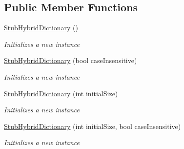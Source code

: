 \subsection*{Public Member Functions}
\begin{DoxyCompactItemize}
\item 
\hyperlink{class_system_1_1_collections_1_1_specialized_1_1_fakes_1_1_stub_hybrid_dictionary_a4633ca581483dcaaad14d17e2996f35e}{Stub\-Hybrid\-Dictionary} ()
\begin{DoxyCompactList}\small\item\em Initializes a new instance\end{DoxyCompactList}\item 
\hyperlink{class_system_1_1_collections_1_1_specialized_1_1_fakes_1_1_stub_hybrid_dictionary_a8f0cd601375b612a98ac9fbd739b54be}{Stub\-Hybrid\-Dictionary} (bool case\-Insensitive)
\begin{DoxyCompactList}\small\item\em Initializes a new instance\end{DoxyCompactList}\item 
\hyperlink{class_system_1_1_collections_1_1_specialized_1_1_fakes_1_1_stub_hybrid_dictionary_ad590dc4d4708ddd0f44bc4799e66da33}{Stub\-Hybrid\-Dictionary} (int initial\-Size)
\begin{DoxyCompactList}\small\item\em Initializes a new instance\end{DoxyCompactList}\item 
\hyperlink{class_system_1_1_collections_1_1_specialized_1_1_fakes_1_1_stub_hybrid_dictionary_ae020740251b571a7189526c4e762fb1f}{Stub\-Hybrid\-Dictionary} (int initial\-Size, bool case\-Insensitive)
\begin{DoxyCompactList}\small\item\em Initializes a new instance\end{DoxyCompactList}\end{DoxyCompactItemize}
